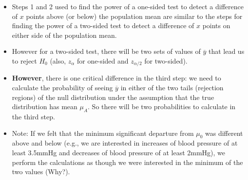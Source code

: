 \documentclass[10pt]{beamer}\usepackage[]{graphicx}\usepackage[]{color}
\begin{document}
{	\begin{itemize}
		\item Steps 1 and 2 used to find the power of a one-sided test to detect a difference of $x$ points above (or below) the population mean are similar to the steps for finding the power of a two-sided test to detect a difference of $x$ points on either side of the population mean. 
		\item However for a two-sided test, there will be two sets of values of $\overline{y}$
		that lead us to reject $H_0$ (also, $z_\alpha$ for one-sided and
		$z_{\alpha/2}$ for two-sided).  %
		
		\item \textbf{However}, there is one critical difference in the third step: we need to
		calculate the probability of seeing $\overline{y}$ in either of the two tails (rejection
		regions) of the null distribution under the assumption that the true distribution has
		mean $\mu_A$. So there will be two probabilities to calculate in the third step. 
		\pause
		
		\item Note: If we felt that the minimum significant departure from $\mu_0$
		was different above and below (e.g., we are interested in increases
		of blood pressure of at least 3.5mmHg and decreases of blood
		pressure of at least 2mmHg), we perform the calculations as though
		we were interested in the minimum of the two values (Why?).
	\end{itemize}
} 

\end{document}
